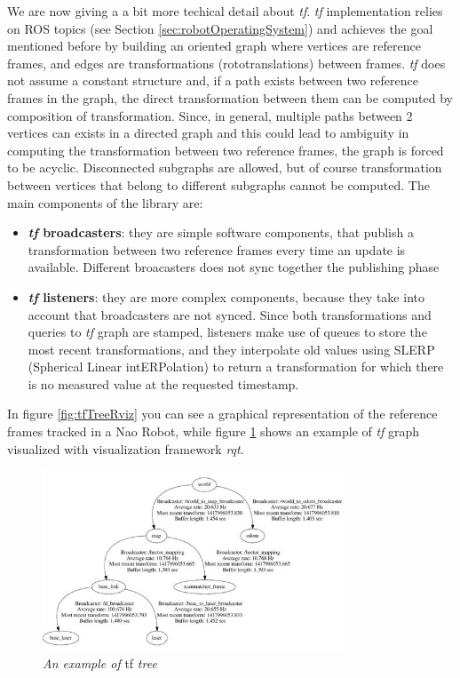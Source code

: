 We are now giving a a bit more techical detail about \textit{tf}.
\textit{tf} implementation relies on \ac{ROS} topics (see Section \ref{sec:robotOperatingSystem}) and achieves the goal mentioned before by building an oriented graph where vertices are reference frames, and edges are transformations (rototranslations) between frames. \textit{tf} does not assume a constant structure and, if a path exists between two reference frames in the graph, the direct transformation between them can be computed by composition of transformation. Since, in general, multiple paths between 2 vertices can exists in a directed graph and this could lead to ambiguity in computing the transformation between two reference frames, the graph is forced to be acyclic. Disconnected subgraphs are allowed, but of course transformation between vertices that belong to different subgraphs cannot be computed. 
The main components of the library are:
\begin{itemize}
	\item \textbf{\textit{tf} broadcasters}: they are simple software components, that publish a transformation between two reference frames every time an update is available. Different broacasters does not sync together the publishing phase
	\item \textbf{\textit{tf} listeners}: they are more complex components, because they take into account that broadcasters are not synced. Since both transformations and queries to \textit{tf} graph are stamped, listeners make use of queues to store the most recent transformations, and they  interpolate old values using SLERP (Spherical Linear intERPolation) to return a transformation for which there is no measured value at the requested timestamp.
\end{itemize}
In figure \ref{fig:tfTreeRviz} you can see a graphical representation of the reference frames tracked in a Nao Robot, while figure \ref{fig:tfGraph} shows an example of \textit{tf} graph visualized with visualization framework \textit{rqt}. 

\begin{figure}
	\centering
	\includegraphics[width=0.8\textwidth]{Images/background_and_tools/tfGraph.JPG}
	\caption{\textit{An example of} tf \textit{tree}}
	\label{fig:tfGraph}
\end{figure}

